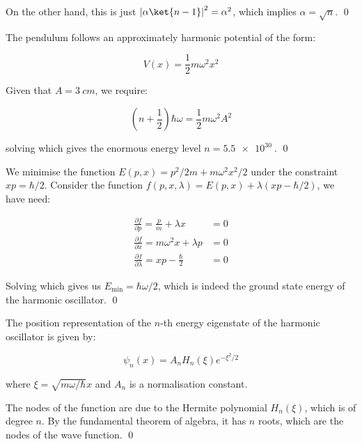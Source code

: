 \documentclass[12pt]{article}
\begin{document}
On the other hand, this is just $\left\lvert \alpha \ket{n - 1} \right\rvert^{2} = \alpha^{2}$, which implies $\alpha = \sqrt{n}$.
\qed


The pendulum follows an approximately harmonic potential of the form:

\begin{equation}
    V(x) = \frac{1}{2} m \omega^{2} x^{2}
\end{equation}

Given that $A = \qty{3}{cm}$, we require:

\begin{equation}
    \left( n + \frac{1}{2} \right) \hbar \omega = \frac{1}{2} m \omega^{2} A^{2}
\end{equation}

solving which gives the enormous energy level $n = \qty{5.5e30}{}$.
\qed


We minimise the function $E(p, x) = p^{2}/2m + m\omega^{2} x^{2}/2$ under the constraint $xp = \hbar/2$. Consider the function $f(p, x, \lambda) = E(p, x) + \lambda (xp - \hbar/2)$, we have need:

\begin{equation}
    \begin{split}
        \frac{\partial f}{\partial p} = \frac{p}{m} + \lambda x &= 0 \\
        \frac{\partial f}{\partial x} = m\omega^{2} x + \lambda p &= 0 \\
        \frac{\partial f}{\partial \lambda} = xp - \frac{\hbar}{2} &= 0
    \end{split}
\end{equation}

Solving which gives us $E_{\text{min}} = \hbar \omega / 2$, which is indeed the ground state energy of the harmonic oscillator.
\qed


The position representation of the $n$-th energy eigenstate of the harmonic oscillator is given by:

\begin{equation}
    \psi_{n}(x) = A_{n} H_{n}(\xi) e^{-\xi^{2}/2}
\end{equation}

where $\xi = \sqrt{m\omega/\hbar} x$ and $A_{n}$ is a normalisation constant.

The nodes of the function are due to the Hermite polynomial $H_{n}(\xi)$, which is of degree $n$. By the fundamental theorem of algebra, it has $n$ roots, which are the nodes of the wave function.
\qed
\end{document}
